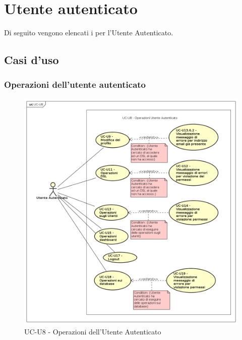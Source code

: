 \section{Utente autenticato}

Di seguito vengono elencati i  per l'Utente Autenticato.
\subsection{Casi d'uso}

\subsubsection{Operazioni dell'utente autenticato}

    \begin{figure}[H]
      \begin{center}
        \includegraphics[width=12cm]{res/img/UCUtenti/UCUtenteA/UC-U8.png}
      \caption{UC-U8 - Operazioni dell'Utente Autenticato}
      \end{center} 
    \end{figure}    
    
